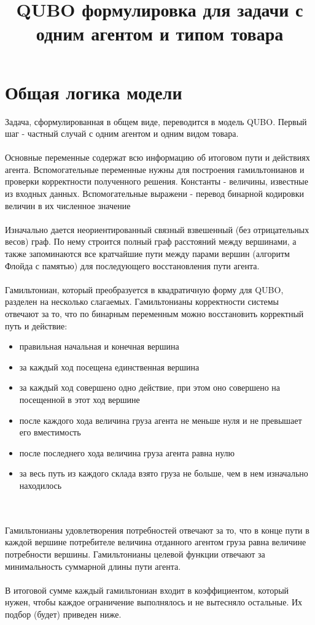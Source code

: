 \documentclass{article}
\title{QUBO формулировка для задачи с одним агентом и типом товара}
\date{}
\begin{document}
\maketitle

\section{Общая логика модели}
Задача, сформулированная в общем виде, переводится в модель QUBO. Первый шаг - частный случай с одним агентом и одним видом товара. \\
\\
Основные переменные содержат всю информацию об итоговом пути и действиях агента. Вспомогательные переменные нужны для построения гамильтонианов и проверки корректности полученного решения. Константы - величины, известные из входных данных. Вспомогательные выражени - перевод бинарной кодировки величин в их численное значение \\
\\
Изначально дается неориентированный связный взвешенный (без отрицательных весов) граф. По нему строится полный граф расстояний между вершинами, а также запоминаются все кратчайшие пути между парами вершин (алгоритм Флойда с памятью) для последующего восстановления пути агента.\\
\\
Гамильтониан, который преобразуется в квадратичную форму для QUBO, разделен на несколько слагаемых. Гамильтонианы корректности системы отвечают за то, что по бинарным переменным можно восстановить корректный путь и действие:
\begin{itemize}
    \item правильная начальная и конечная вершина
    \item за каждый ход посещена единственная вершина
    \item за каждый ход совершено одно действие, при этом оно совершено на посещенной в этот ход вершине
    \item после каждого хода величина груза агента не меньше нуля и не превышает его вместимость
    \item после последнего хода величина груза агента равна нулю
    \item за весь путь из каждого склада взято груза не больше, чем в нем изначально находилось
    
\end{itemize} \\
\\
Гамильтонианы удовлетворения потребностей отвечают за то, что в конце пути в каждой вершине потребителе величина отданного агентом груза равна величине потребности вершины. Гамильтонианы целевой функции отвечают за минимальность суммарной длины пути агента.\\
\\
В итоговой сумме каждый гамильтониан входит в коэффициентом, который нужен, чтобы каждое ограничение выполнялось и не вытесняло остальные. Их подбор (будет) приведен ниже.
\end{document}
